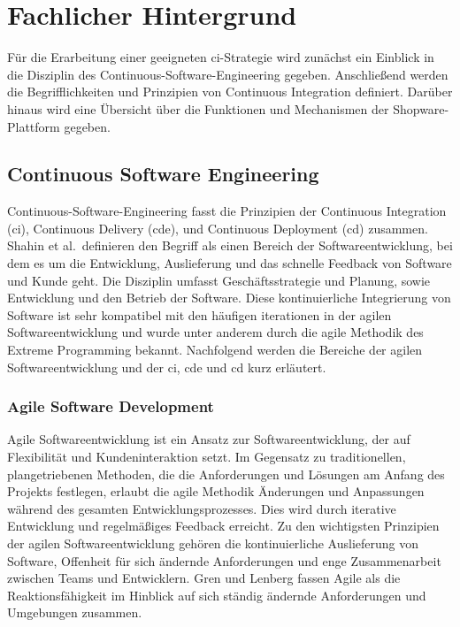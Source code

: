 
\section{Fachlicher Hintergrund} \label{sec:02-background}

Für die Erarbeitung einer geeigneten \acrshort{ci}-Strategie wird zunächst ein Einblick in die Disziplin des
Continuous-Software-Engineering gegeben.
Anschließend werden die Begrifflichkeiten und Prinzipien von Continuous Integration definiert.
Darüber hinaus wird eine Übersicht über die Funktionen und Mechanismen der Shopware-Plattform gegeben.

\subsection{Continuous Software Engineering} \label{subsec:02-background-1}

Continuous-Software-Engineering fasst die Prinzipien der Continuous Integration (\acrshort{ci}),
Continuous Delivery (\acrshort{cde}), und Continuous Deployment (\acrshort{cd}) zusammen.
Shahin et al.\ definieren den Begriff als einen Bereich der Softwareentwicklung, bei dem es um die Entwicklung,
Auslieferung und das schnelle Feedback von Software und Kunde geht.
Die Disziplin umfasst Geschäftsstrategie und Planung, sowie Entwicklung und den Betrieb der Software.
Diese kontinuierliche Integrierung von Software ist sehr kompatibel mit den häufigen iterationen in der agilen
Softwareentwicklung und wurde unter anderem durch die agile Methodik des Extreme Programming bekannt.
Nachfolgend werden die Bereiche der agilen Softwareentwicklung und der \acrshort{ci}, \acrshort{cde} und \acrshort{cd}
kurz erläutert.

\subsubsection{Agile Software Development}

Agile Softwareentwicklung ist ein Ansatz zur Softwareentwicklung, der auf Flexibilität und Kundeninteraktion setzt.
Im Gegensatz zu traditionellen, plangetriebenen Methoden, die die Anforderungen und Lösungen am Anfang des Projekts
festlegen, erlaubt die agile Methodik Änderungen und Anpassungen während des gesamten Entwicklungsprozesses.
Dies wird durch iterative Entwicklung und regelmäßiges Feedback erreicht.
Zu den wichtigsten Prinzipien der agilen Softwareentwicklung gehören die kontinuierliche Auslieferung von Software,
Offenheit für sich ändernde Anforderungen und enge Zusammenarbeit zwischen Teams und Entwicklern.
Gren und Lenberg fassen Agile als die Reaktionsfähigkeit im Hinblick auf sich ständig ändernde Anforderungen
und Umgebungen zusammen.

